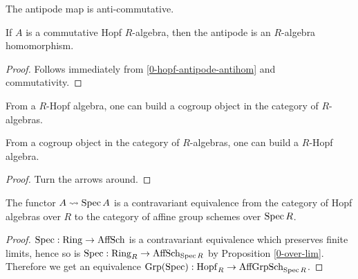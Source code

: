 \begin{proposition}
  \label{0-hopf-antipode-antihom}
  \uses{}

  The antipode map is anti-commutative.
\end{proposition}

\begin{proposition}
  \label{0-commhopf-antipode-hom}
  \uses{}

  If $A$ is a commutative Hopf $R$-algebra, then the antipode is an $R$-algebra homomorphism.
\end{proposition}
\begin{proof}

  Follows immediately from \ref{0-hopf-antipode-antihom} and commutativity.
\end{proof}

\begin{proposition}
  \label{0-hopf-cogrp-alg}

  From a $R$-Hopf algebra, one can build a cogroup object in the category of $R$-algebras.

  From a cogroup object in the category of $R$-algebras, one can build a $R$-Hopf algebra.
\end{proposition}
\begin{proof}
  \uses{}

  Turn the arrows around.
\end{proof}


\begin{proposition}
  \label{0-hopf-equiv-aff-grp-sch}
  \uses{}
  \leanok

  The functor $A\rightsquigarrow \operatorname{Spec} A$ is a contravariant equivalence from the category of Hopf algebras over $R$ to the category of affine group schemes over $\operatorname{Spec} R$.
\end{proposition}
\begin{proof}

  $\operatorname{Spec} : \operatorname{Ring} \to \operatorname{AffSch}$ is a contravariant equivalence which preserves finite limits, hence so is
  $\operatorname{Spec} : \operatorname{Ring}_R \to \operatorname{AffSch}_{\operatorname{Spec} R}$ by Proposition \ref{0-over-lim}. Therefore we get an equivalence $\operatorname{Grp}(\operatorname{Spec}) : \operatorname{Hopf}_R \to \operatorname{AffGrpSch}_{\operatorname{Spec} R}$.
\end{proof}



